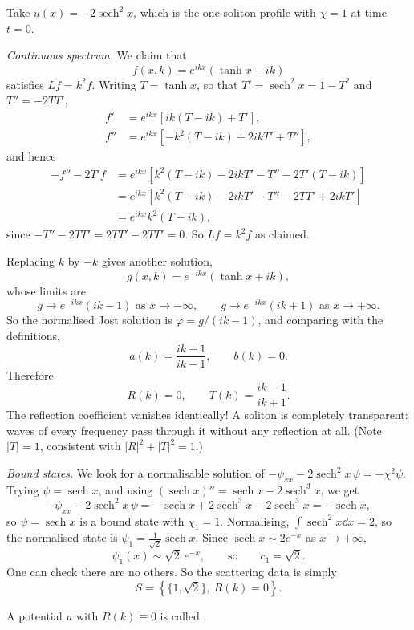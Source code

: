 \documentclass[a4paper]{scrartcl}
\DeclareMathOperator{\sech}{sech}
\begin{document}
\begin{example}
	Take $u(x) = -2\sech^2x$, which is the one-soliton profile with $\chi = 1$ at time $t=0$.

	\emph{Continuous spectrum.} We claim that
	$$
	f(x,k) = e^{ikx}\left(\tanh x - ik\right)
	$$
	satisfies $Lf = k^2f$. Writing $T = \tanh x$, so that $T' = \sech^2x = 1 - T^2$ and $T'' = -2TT'$,
	\begin{align*}
		f' &= e^{ikx}\left[ik(T-ik) + T'\right],\\
		f'' &= e^{ikx}\left[-k^2(T-ik) + 2ikT' + T''\right],
	\end{align*}
	and hence
	\begin{align*}
		-f'' - 2T'f &= e^{ikx}\left[k^2(T-ik) - 2ikT' - T'' - 2T'(T-ik)\right]\\
		&= e^{ikx}\left[k^2(T-ik) - 2ikT' - T'' - 2TT' + 2ikT'\right]\\
		&= e^{ikx}k^2(T-ik),
	\end{align*}
	since $-T'' - 2TT' = 2TT' - 2TT' = 0$. So $Lf = k^2f$ as claimed.

	Replacing $k$ by $-k$ gives another solution,
	$$
	g(x,k) = e^{-ikx}\left(\tanh x + ik\right),
	$$
	whose limits are
	$$
	g \to e^{-ikx}(ik - 1) \text{ as } x\to-\infty, \qquad g\to e^{-ikx}(ik+1)\text{ as }x\to+\infty.
	$$
	So the normalised Jost solution is $\varphi = g/(ik-1)$, and comparing with the definitions,
	$$
	a(k) = \frac{ik+1}{ik-1}, \qquad b(k) = 0.
	$$
	Therefore
	$$
	R(k) = 0, \qquad T(k) = \frac{ik-1}{ik+1}.
	$$
	The reflection coefficient vanishes identically! A soliton is completely transparent: waves of every frequency pass through it without any reflection at all. (Note $|T| = 1$, consistent with $|R|^2+|T|^2=1$.)

	\emph{Bound states.} We look for a normalisable solution of $-\psi_{xx} - 2\sech^2x\,\psi = -\chi^2\psi$. Trying $\psi = \sech x$, and using $(\sech x)'' = \sech x - 2\sech^3x$, we get
	$$
	-\psi_{xx} - 2\sech^2x\,\psi = -\sech x + 2\sech^3x - 2\sech^3x = -\sech x,
	$$
	so $\psi = \sech x$ is a bound state with $\chi_1 = 1$. Normalising, $\int\sech^2x\dd x = 2$, so the normalised state is $\psi_1 = \frac{1}{\sqrt2}\sech x$. Since $\sech x\sim 2e^{-x}$ as $x\to+\infty$,
	$$
	\psi_1(x)\sim\sqrt2\,e^{-x}, \qquad\text{so}\qquad c_1 = \sqrt2.
	$$
	One can check there are no others. So the scattering data is simply
	$$
	S = \left\{\{1, \sqrt2\},\ R(k) = 0\right\}.
	$$
\end{example}

\begin{definition}
	A potential $u$ with $R(k) \equiv 0$ is called .
\end{definition}
\end{document}
